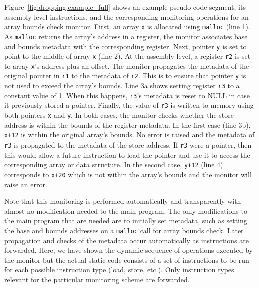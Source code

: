 Figure~\ref{fig:dropping.example_full} shows an example pseudo-code segment,
its assembly level instructions, and the corresponding monitoring operations
for an array bounds check monitor. 
First, an array {\tt x} is allocated using {\tt malloc} (line 1). 
As {\tt malloc} returns the array's address in a register, the monitor
associates base and bounds metadata with the corresponding register. 
Next, pointer {\tt y} is set to point to the middle of array {\tt x} (line 2). 
At the assembly level, a register {\tt r2} is set to array {\tt x}'s address plus an offset.
The monitor propagates the metadata of the original pointer in {\tt r1} to the
metadata of {\tt r2}. This is to ensure that pointer {\tt y} is not used to exceed the array's bounds.
Line 3a shows setting register {\tt r3} to a constant value of 1.
When this happens,
{\tt r3}'s metadata is reset to NULL in case it previously stored a
pointer. 
Finally, the value of {\tt r3} is written to memory using both pointers {\tt x} and {\tt y}.
In both cases, the monitor checks whether the store address is within the bounds of the register metadata. In the first case (line 3b), {\tt x+12}
is within the original array's bounds. No error is raised and the metadata of
{\tt r3} is propagated to the metadata of the store address. If {\tt r3} were a
pointer, then this would allow a future instruction to load the pointer and use
it to access the corresponding array or data structure. In the second case,
{\tt y+12} (line 4) corresponds to {\tt x+20} which is not within the array's bounds and
the monitor will raise an error. 

Note that this monitoring is performed automatically and transparently with
almost no modification needed to the main program. The only modifications to
the main program that are needed are to initially set metadata, such as setting
the base and bounds addresses on a {\tt malloc} call for array bounds check.
Later propagation and checks of the metadata occur automatically as
instructions are forwarded.
Here, we have shown the dynamic sequence of operations executed by the monitor but
the actual static code consists of a set of instructions to be run for each
possible instruction type (load, store, etc.). Only instruction types relevant
for the particular monitoring scheme are forwarded.

